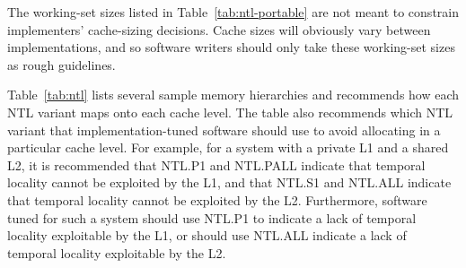 \begin{commentary}
The working-set sizes listed in Table~\ref{tab:ntl-portable} are not meant to
constrain implementers' cache-sizing decisions.
Cache sizes will obviously vary between implementations, and so software
writers should only take these working-set sizes as rough guidelines.
\end{commentary}

Table~\ref{tab:ntl} lists several sample memory hierarchies and recommends
how each NTL variant maps onto each cache level.
The table also recommends which NTL variant that implementation-tuned
software should use to avoid allocating in a particular cache level.
For example, for a system with a private L1 and a shared L2, it is recommended
that NTL.P1 and NTL.PALL indicate that temporal locality cannot be exploited by
the L1, and that NTL.S1 and NTL.ALL indicate that temporal locality cannot be
exploited by the L2.
Furthermore, software tuned for such a system should use NTL.P1 to indicate
a lack of temporal locality exploitable by the L1, or should use NTL.ALL
indicate a lack of temporal locality exploitable by the L2.

